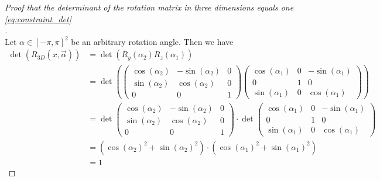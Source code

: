 \begin{proof}[Proof that the determinant of the rotation matrix in three dimensions equals one \eqref{eq:constraint_det}\\]$\,$\\
	Let $\alpha \in [-\pi, \pi]^2$ be an arbitrary rotation angle. Then we have
	\begin{equation}
	\label{proof:det_one_dim3}
	\begin{aligned}
	\det (R_{3D}(x, \vec{\alpha})) &= \det(R_{y}(\alpha_2) R_{z}(\alpha_1)) \\
	&= \det \left( \begin{pmatrix} \cos(\alpha_2) & -\sin(\alpha_2) & 0\\\sin(\alpha_2) & \cos(\alpha_2) & 0\\ 0 & 0 & 1\end{pmatrix} \begin{pmatrix} \cos(\alpha_1) & 0 & -\sin(\alpha_1)\\ 0 & 1 & 0\\\sin(\alpha_1) & 0 & \cos(\alpha_1)\end{pmatrix} \right)\\
	&= \det \begin{pmatrix} \cos(\alpha_2) & -\sin(\alpha_2) & 0\\\sin(\alpha_2) & \cos(\alpha_2) & 0\\ 0 & 0 & 1\end{pmatrix} \cdot \det \begin{pmatrix} \cos(\alpha_1) & 0 & -\sin(\alpha_1)\\ 0 & 1 & 0\\\sin(\alpha_1) & 0 & \cos(\alpha_1)\end{pmatrix}\\
	&= (\cos(\alpha_2)^2 + \sin(\alpha_2)^2) \cdot (\cos(\alpha_1)^2 + \sin(\alpha_1)^2)\\
	&= 1
	\end{aligned}
	\end{equation}
\end{proof}

